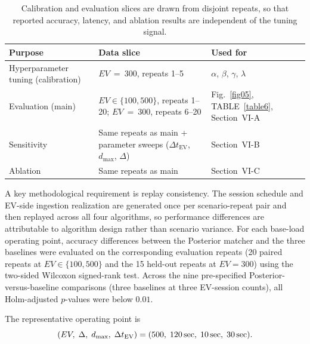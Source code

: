 \documentclass{ieeeaccess}
\begin{document}
    \begin{table}[htbp]
        \caption{Calibration and evaluation slices are drawn from disjoint repeats, so that reported accuracy, latency, and ablation results are independent of the tuning signal.}
        \label{table:calib_eval}
        \centering
        \begin{tabular}{p{2.0cm} p{2.5cm} p{2.7cm}}
            \toprule
            \textbf{Purpose} & \textbf{Data slice} & \textbf{Used for} \\
            \midrule
            Hyperparameter tuning (calibration) & $EV~=~300$, repeats 1--5 & $\alpha$, $\beta$, $\gamma$, $\lambda$ \\
            Evaluation (main) & $EV \in \{100, 500\}$, repeats 1--20; $EV~=~300$, repeats 6--20 & Fig.~\ref{fig05}, TABLE~\ref{table6}, Section~VI-A \\
            Sensitivity & Same repeats as main + parameter sweeps ($\Delta t_{\text{EV}}$, $d_{\max}$, $\Delta$) & Section~VI-B \\
            Ablation & Same repeats as main & Section~VI-C \\
            \bottomrule
        \end{tabular}
    \end{table}

    A key methodological requirement is replay consistency.
    The session schedule and EV-side ingestion realization are generated once per scenario-repeat pair and then replayed across all four algorithms, so performance differences are attributable to algorithm design rather than scenario variance.
    For each base-load operating point, accuracy differences between the Posterior matcher and the three baselines were evaluated on the corresponding evaluation repeats (20 paired repeats at $EV \in \{100,500\}$ and the 15 held-out repeats at $EV=300$) using the two-sided Wilcoxon signed-rank test.
    Across the nine pre-specified Posterior-versus-baseline comparisons (three baselines at three EV-session counts), all Holm-adjusted $p$-values were below $0.01$.

    The representative operating point is
    \begin{equation}\label{eq:e16}
        (EV,\; \Delta,\; d_{\max},\; \Delta t_{\text{EV}}) = (500,\; 120\text{\,\text{sec}},\; 10\text{\,\text{sec}},\; 30\text{\,\text{sec}}).
    \end{equation}
\end{document}
